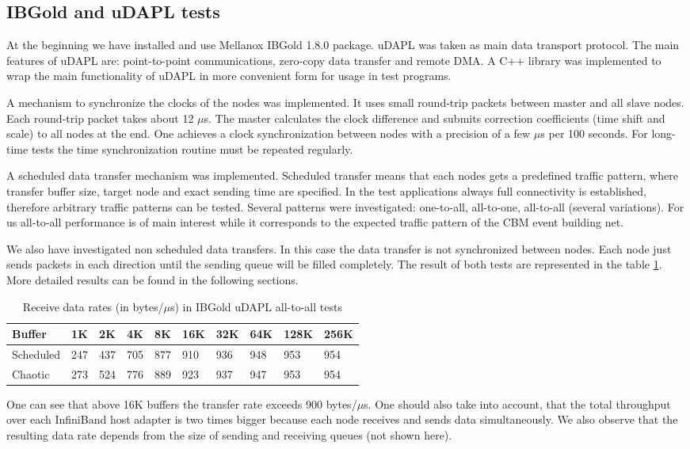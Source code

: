 \subsection{IBGold and uDAPL tests}
At the beginning we have installed and use Mellanox IBGold 1.8.0 package.
uDAPL was taken as main data transport protocol.
The main features of uDAPL are: point-to-point communications, zero-copy data transfer and remote DMA.
A C++ library was implemented to wrap the main functionality of uDAPL in more convenient form for usage in test programs.

A mechanism to synchronize the clocks of the nodes was implemented.
It uses small round-trip packets between master and all slave nodes.
Each round-trip packet takes about 12 $\mu$s. The master calculates the clock difference
and submits correction coefficients (time shift and scale) to all nodes at the end.
One achieves a clock synchronization between nodes with a precision of a few $\mu$s
per 100 seconds. For long-time tests the time synchronization routine must be repeated regularly.

A scheduled data transfer mechanism was implemented. Scheduled transfer means that each
nodes gets a predefined traffic pattern, where transfer buffer size, target node and
exact sending time are specified. In the test applications always full connectivity is
established, therefore arbitrary traffic patterns can be tested. Several patterns
were investigated: one-to-all, all-to-one, all-to-all (several variations).
For us all-to-all performance is of main interest while it corresponds to the
expected traffic pattern of the CBM event building net.

We also have investigated non scheduled data transfers.
In this case the data transfer is not synchronized between nodes.
Each node just sends packets in each direction until the
sending queue will be filled completely. The result of both tests are represented in the table \ref{test-xmit-table}.
More detailed results can be found in the following sections.

\begin{table}[h]
\begin{tabular}{|p{3.0cm}|p{1.0cm}|p{1.0cm}|p{1.0cm}|p{1.0cm}|p{1.0cm}|p{1.0cm}|p{1.0cm}|p{1.0cm}|p{1.0cm}|}      \hline
Buffer & 1K & 2K & 4K & 8K & 16K & 32K & 64K & 128K & 256K \\ \hline
Scheduled & 247 & 437 & 705 & 877 & 910 & 936 & 948 & 953 & 954 \\ \hline
Chaotic & 273 & 524 & 776 & 889 & 923 & 937 & 947 & 953 & 954 \\ \hline
\end{tabular}
\caption{Receive data rates (in bytes/$\mu$s) in IBGold uDAPL all-to-all tests}
\label{test-xmit-table}
\end{table}
One can see that above 16K buffers the transfer rate exceeds 900 bytes/$\mu$s.
One should also take into account, that the total throughput over each InfiniBand
host adapter is two times bigger because each node receives and sends data simultaneously.
We also observe that the resulting data rate depends from the size of sending and receiving queues (not shown here).

